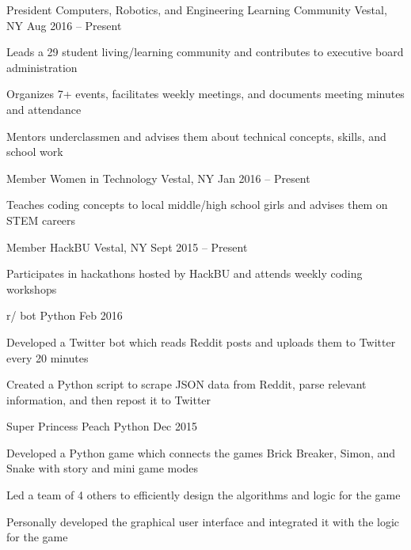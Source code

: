 \documentclass[]{awesome-cv}
\begin{document}
\begin{cventries}
	\cventry
    {President}
	{Computers, Robotics, and Engineering Learning Community}
	{Vestal, NY}
	{Aug 2016 – Present}
	{\begin{cvitems}
		\item {Leads a 29 student living/learning community and contributes to executive board administration}
		\item {Organizes 7+ events, facilitates weekly meetings, and documents meeting minutes and attendance}
        \item {Mentors underclassmen and advises them about technical concepts, skills, and school work}
	\end{cvitems}}
    \cventry
    {Member}
	{Women in Technology}
	{Vestal, NY}
	{Jan 2016 – Present}
	{\begin{cvitems}
		\item {Teaches coding concepts to local middle/high school girls and advises them on STEM careers}
	\end{cvitems}}
    \cventry
    {Member}
	{HackBU}
	{Vestal, NY}
	{Sept 2015 – Present}
	{\begin{cvitems}
		\item {Participates in hackathons hosted by HackBU and attends weekly coding workshops}
	\end{cvitems}}
\end{cventries}
\vspace{-2mm}

\begin{cventries}
    \cventry
    {}
    {r/ bot}
    {Python}
    {Feb 2016}
    {\begin{cvitems}
        \vspace{-4mm}
        \item {Developed a Twitter bot which reads Reddit posts and uploads them to Twitter every 20 minutes}
        \item {Created a Python script to scrape JSON data from Reddit, parse relevant information, and then repost it to Twitter}
    \end{cvitems}}
    \vspace{-2mm}

	\cventry
    {}
    {Super Princess Peach}
    {Python}
    {Dec 2015}
    {\begin{cvitems}
        \vspace{-4mm}
		\item {Developed a Python game which connects the games Brick Breaker, Simon, and Snake with story and mini game modes}
		\item {Led a team of 4 others to efficiently design the algorithms and logic for the game}
        \item {Personally developed the graphical user interface and integrated it with the logic for the game}
    \end{cvitems}}
	\vspace{-2mm}
\end{cventries}
\vspace{-10mm}
\end{document}
